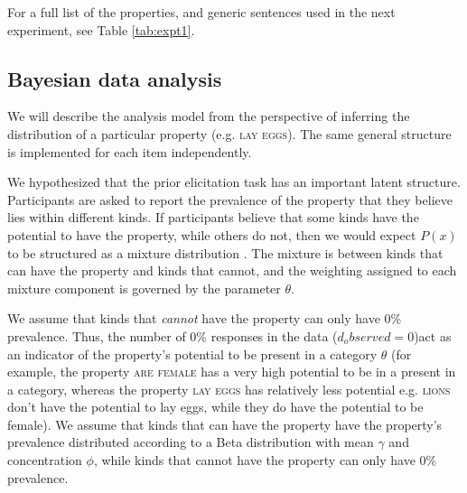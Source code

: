 \documentclass[10pt,letterpaper]{article}
\begin{document}
For a full list of the properties, and generic sentences used in the next experiment, see Table \ref{tab:expt1}.

\subsection{Bayesian data analysis}
\label{sec:bda1}

We will describe the analysis model from the perspective of inferring the distribution of a particular property (e.g. \textsc{lay eggs}). 
The same general structure is implemented for each item independently. 

We hypothesized that the prior elicitation task has an important latent structure. 
Participants are asked to report the prevalence of the property that they believe lies within different kinds.
If participants believe that some kinds have the potential to have the property, while others do not, then we would expect $P(x)$ to be structured as a mixture distribution \cite{Griffiths2005}.
The mixture is between kinds that can have the property and kinds that cannot, and the weighting assigned to each mixture component is governed by the parameter $\theta$.

We assume that kinds that \emph{cannot} have the property can only have 0\% prevalence. 
 Thus, the number of 0\% responses in the data ($d_observed = 0$)act as an indicator of the property's potential to be present in a category $\theta$ (for example, the property \textsc{are female} has a very high potential to be in a present in a category, whereas the property \textsc{lay eggs} has relatively less potential e.g. \textsc{lions} don't have the potential to lay eggs, while they do have the potential to be female).
  We assume that kinds that can have the property have the property's prevalence distributed according to a Beta distribution with mean $\gamma$ and concentration $\phi$, while kinds that cannot have the property can only have 0\% prevalence. 
\end{document}
